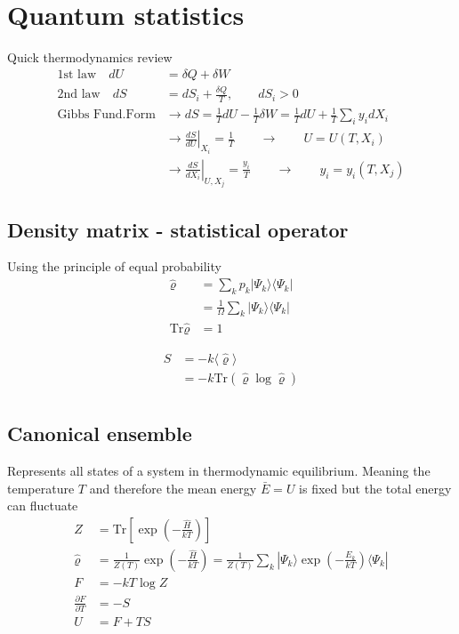 \documentclass[10pt,a4paper]{book}
\theoremstyle{definition}
\begin{document}
\section{Quantum statistics}
Quick thermodynamics review
\begin{align}
\text{1st law}\quad dU&=\delta Q+\delta W\\
\text{2nd law}\quad dS&=dS_i+\frac{\delta Q}{T}, \qquad dS_i>0\\
\text{Gibbs Fund.Form}&\rightarrow dS=\frac{1}{T}dU-\frac{1}{T}\delta W=\frac{1}{T}dU+\frac{1}{T}\sum_i y_idX_i\\
&\rightarrow \left.\frac{dS}{dU}\right|_{X_i}=\frac{1}{T}\qquad\rightarrow\qquad U=U(T,X_i)\\
&\rightarrow \left.\frac{dS}{dX_i}\right|_{U,X_j}=\frac{y_i}{T}\qquad\rightarrow\qquad y_i=y_i(T,X_j)
\end{align}

\subsection{Density matrix - statistical operator}
Using the principle of equal probability
\begin{align}
\hat{\varrho}&=\sum_k p_k|\Psi_k\rangle\langle\Psi_k|\\
&=\frac{1}{\Omega}\sum_k |\Psi_k\rangle\langle\Psi_k|\\
\text{Tr}\hat\varrho&=1
\end{align}

\begin{align}
S
&=-k\langle\hat\varrho\rangle\\
&=-k\text{Tr}(\hat\varrho\log\hat\varrho)\\
\end{align}

\subsection{Canonical ensemble}
Represents all states of a system in thermodynamic equilibrium. Meaning the temperature $T$ and therefore the mean energy $\bar{E}=U$ is fixed but the total energy can fluctuate
\begin{align}
Z&=\text{Tr}\left[\exp\left(-\frac{\hat{H}}{kT}\right)\right]\\
\hat{\varrho}&=\frac{1}{Z(T)}\exp\left(-\frac{\hat{H}}{kT}\right)=\frac{1}{Z(T)}\sum_k|\Psi_k\rangle\exp\left(-\frac{E_k}{kT}\right)\langle\Psi_k|\\
F&=-kT\log Z\\
\frac{\partial F}{\partial T}&=-S\\
U&=F+TS
\end{align}
\end{document}
